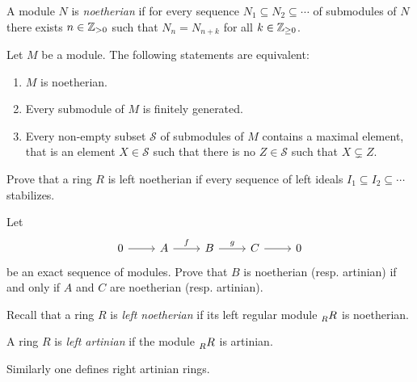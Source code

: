 A module $N$ is \emph{noetherian} if for every sequence 
$N_1\subseteq N_2\subseteq\cdots$ of submodules of $N$ there exists $n\in\mathbb{Z}_{>0}$ such that 
$N_n=N_{n+k}$ for all $k\in\mathbb{Z}_{\geq0}$. 


\begin{exercise}
    Let $M$ be a module. The following statements are equivalent:
    \begin{enumerate}
        \item $M$ is noetherian.
        \item Every submodule of $M$ is finitely generated. 
        \item Every non-empty subset $\mathcal{S}$ of submodules of $M$ contains a maximal element, that is
            an element $X\in\mathcal{S}$ such that there is no $Z\in\mathcal{S}$ such that $X\subsetneq Z$.  
    \end{enumerate}
\end{exercise}

\begin{exercise}
    Prove that a ring $R$ is left noetherian if every sequence of 
    left ideals $I_1\subseteq I_2\subseteq\cdots$ stabilizes. 
\end{exercise}

\begin{exercise}
\label{xca:AN_exact}
	Let 
	\[
	\begin{tikzcd}
		0 \arrow{r}
		& A \arrow{r}{f}
		& B \arrow{r}{g}
		& C \arrow{r}
		& 0
	\end{tikzcd}
	\]
	be an exact sequence of modules. Prove that $B$ is noetherian (resp.
	artinian) if and only if $A$ and $C$ are noetherian (resp. artinian).
\end{exercise}

Recall that a ring $R$ is \emph{left noetherian}
if its left regular module $\prescript{}{R}R$ is noetherian.

\begin{definition}
	A ring $R$ is \emph{left artinian} if the module 
	$\prescript{}{R}R$ is artinian.
\end{definition}

Similarly one defines right artinian rings. 

